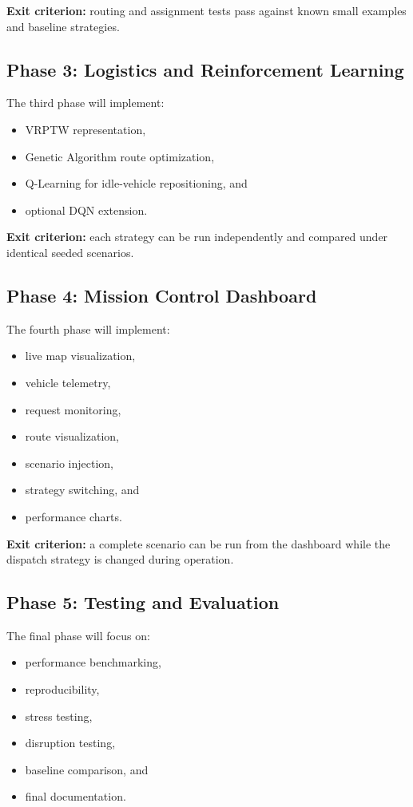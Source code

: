 \documentclass[12pt,a4paper]{article}
\begin{document}
\textbf{Exit criterion:} routing and assignment tests pass against
known small examples and baseline strategies.

\subsection{Phase 3: Logistics and Reinforcement Learning}

The third phase will implement:

\begin{itemize}
    \item VRPTW representation,
    \item Genetic Algorithm route optimization,
    \item Q-Learning for idle-vehicle repositioning, and
    \item optional DQN extension.
\end{itemize}

\textbf{Exit criterion:} each strategy can be run independently and
compared under identical seeded scenarios.

\subsection{Phase 4: Mission Control Dashboard}

The fourth phase will implement:

\begin{itemize}
    \item live map visualization,
    \item vehicle telemetry,
    \item request monitoring,
    \item route visualization,
    \item scenario injection,
    \item strategy switching, and
    \item performance charts.
\end{itemize}

\textbf{Exit criterion:} a complete scenario can be run from the
dashboard while the dispatch strategy is changed during operation.

\subsection{Phase 5: Testing and Evaluation}

The final phase will focus on:

\begin{itemize}
    \item performance benchmarking,
    \item reproducibility,
    \item stress testing,
    \item disruption testing,
    \item baseline comparison, and
    \item final documentation.
\end{itemize}
\end{document}
